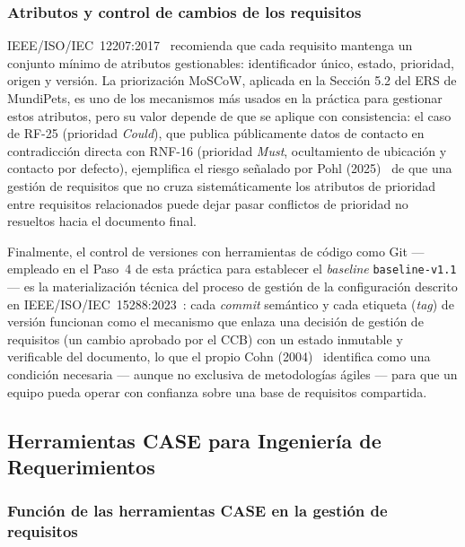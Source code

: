 \documentclass[journal,onecolumn]{IEEEtran}
\begin{document}
	\subsubsection{Atributos y control de cambios de los requisitos}
	
	IEEE/ISO/IEC~12207:2017~\cite{ieee12207_2017} recomienda que cada
	requisito mantenga un conjunto mínimo de atributos gestionables:
	identificador único, estado, prioridad, origen y versión. La
	priorización MoSCoW, aplicada en la Sección 5.2 del ERS de
	MundiPets, es uno de los mecanismos más usados en la práctica para
	gestionar estos atributos, pero su valor depende de que se aplique
	con consistencia: el caso de RF-25 (prioridad \emph{Could}), que
	publica públicamente datos de contacto en contradicción directa
	con RNF-16 (prioridad \emph{Must}, ocultamiento de ubicación y
	contacto por defecto), ejemplifica el riesgo señalado por Pohl
	(2025)~\cite{pohl2025} de que una gestión de requisitos que no
	cruza sistemáticamente los atributos de prioridad entre requisitos
	relacionados puede dejar pasar conflictos de prioridad no
	resueltos hacia el documento final.
	
	Finalmente, el control de versiones con herramientas de código
	como Git --- empleado en el Paso~4 de esta práctica para
	establecer el \emph{baseline} \texttt{baseline-v1.1} --- es la
	materialización técnica del proceso de gestión de la
	configuración descrito en
	IEEE/ISO/IEC~15288:2023~\cite{ieee15288_2023}: cada \emph{commit}
	semántico y cada etiqueta (\emph{tag}) de versión funcionan como
	el mecanismo que enlaza una decisión de gestión de requisitos (un
	cambio aprobado por el CCB) con un estado inmutable y verificable
	del documento, lo que el propio Cohn (2004)~\cite{cohn2004}
	identifica como una condición necesaria --- aunque no exclusiva de
	metodologías ágiles --- para que un equipo pueda operar con
	confianza sobre una base de requisitos compartida.
	
	\subsection{Herramientas CASE para Ingeniería de Requerimientos}
	\label{sec:case-teoria}
	
	\subsubsection{Función de las herramientas CASE en la gestión de requisitos}
	
\end{document}
